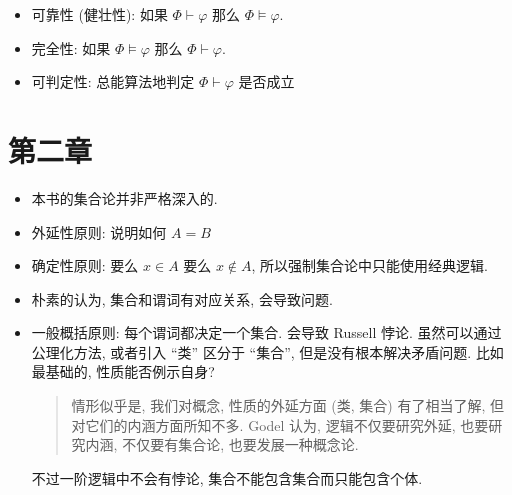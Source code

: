\documentclass[a4paper]{article}
\begin{document}
\begin{itemize}
\item 可靠性 (健壮性): 如果 $\Phi \vdash\varphi$ 那么 $\Phi \models \varphi$.
\item 完全性: 如果 $\Phi \models \varphi$ 那么 $\Phi \vdash \varphi$.
\item 可判定性: 总能算法地判定 $\Phi \vdash \varphi$ 是否成立
\end{itemize}



\section{第二章}
\begin{itemize}
\item 本书的集合论并非严格深入的.

\item 外延性原则: 说明如何 $A = B$
\item 确定性原则: 要么 $x\in A$ 要么 $x\not\in A$, 所以强制集合论中只能使用经典逻辑.

\item 朴素的认为, 集合和谓词有对应关系, 会导致问题.

\item 一般概括原则: 每个谓词都决定一个集合. 会导致 Russell 悖论.
    虽然可以通过公理化方法, 或者引入 ``类'' 区分于 ``集合'', 但是没有根本解决矛盾问题.
    比如最基础的, 性质能否例示自身?
    \begin{quote}
        情形似乎是, 我们对概念, 性质的外延方面 (类, 集合) 有了相当了解, 但对它们的内涵方面所知不多.
        Godel 认为, 逻辑不仅要研究外延, 也要研究内涵, 不仅要有集合论, 也要发展一种概念论.
    \end{quote}
    不过一阶逻辑中不会有悖论, 集合不能包含集合而只能包含个体.
\end{itemize}
\end{document}

